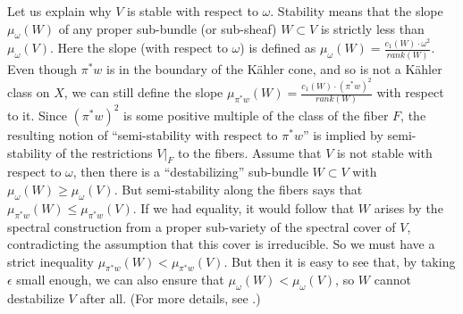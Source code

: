 \documentclass[a4paper,12pt]{article}
\numberwithin{equation}{section}
\theoremstyle{plain}
\begin{document}
Let us explain why $V$ is stable with respect to $\omega$. Stability
means that the slope $\mu_\omega(W)$ of any proper sub-bundle (or sub-sheaf) 
$W \subset V$ is strictly less than $\mu_\omega(V)$. Here the slope (with
respect to $\omega$) is defined as 
$\mu_\omega(W) = \frac{c_1(W) \cdot \omega^2}{rank(W)}$.
Even though ${\pi}^*w$ is in the boundary of the K\"{a}hler cone, and so
is not a K\"{a}hler class on $X$, we can still define the slope 
$\mu_{{\pi}^*w}(W)= \frac{c_1(W) \cdot (\pi^*w)^2}{rank(W)}$ 
with respect to it. Since $({\pi}^*w)^2$
is some positive multiple of the class of the fiber $F$, the resulting notion
of ``semi-stability with respect to ${\pi}^*w$'' is implied by
semi-stability of the restrictions $V {\vert}_F$ to the fibers.
Assume that $V$ is not stable with respect to $\omega$, then there is a
``destabilizing'' sub-bundle $W \subset V$ with $\mu_\omega(W) \ge \mu_\omega(V)$.
But semi-stability along the fibers says that $\mu_{{\pi}^*w}(W) \le
\mu_{{\pi}^*w}(V)$. If we had equality, it would follow that $W$
arises by the spectral construction from a proper sub-variety of the
spectral cover of $V$, contradicting the assumption that this cover is
irreducible. So we must have a strict inequality $\mu_{{\pi}^*w}(W)
<\mu_{{\pi}^*w}(V)$.
But then it is easy to see that, by taking $\epsilon$ small enough, we can
also ensure that $\mu_{\omega}(W) < \mu_{\omega}(V)$, so $W$ cannot destabilize $V$
after all. (For more details, see \cite{FMW2}.)
\end{document}
